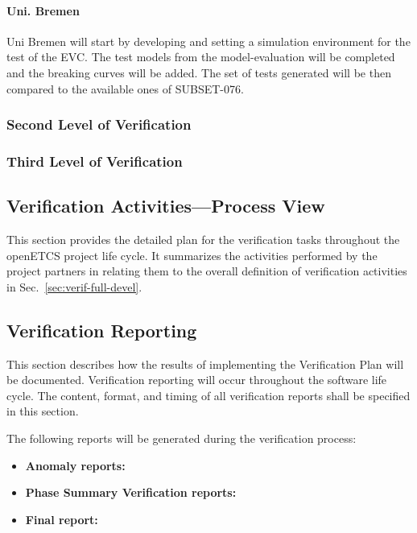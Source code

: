 \documentclass{template/openetcs_report}
\begin{document}
  \paragraph{Uni. Bremen}
  Uni Bremen will start by developing and setting a simulation
  environment for the test of the EVC. The test models from the
  model-evaluation will be completed and the breaking curves will be
  added. 
  The set of tests generated will be then compared to the available
  ones of SUBSET-076. 


\subsubsection{Second Level of Verification}
\label{sec:secon-level-verif}

\subsubsection{Third Level of Verification}
\label{sec:third-level-verif}


\subsection{Verification Activities---Process View}
\label{sec:verif-activ-proce}
This section provides the detailed plan for the verification tasks
throughout the openETCS project life cycle. It summarizes the
activities performed by the project partners in relating them to the
overall definition of verification activities in
Sec.~\ref{sec:verif-full-devel}. 

\subsection{Verification Reporting}
This section describes how the results of implementing the Verification Plan will be documented.
Verification reporting will occur throughout the software life cycle.
The content, format, and timing of all verification reports shall be specified in this section.


The following reports will be generated during the verification process:
\begin{itemize}
\item \textbf{Anomaly reports:} 
\item \textbf{Phase Summary Verification reports:} 
\item \textbf{Final report:}
\end{itemize}
\end{document}
